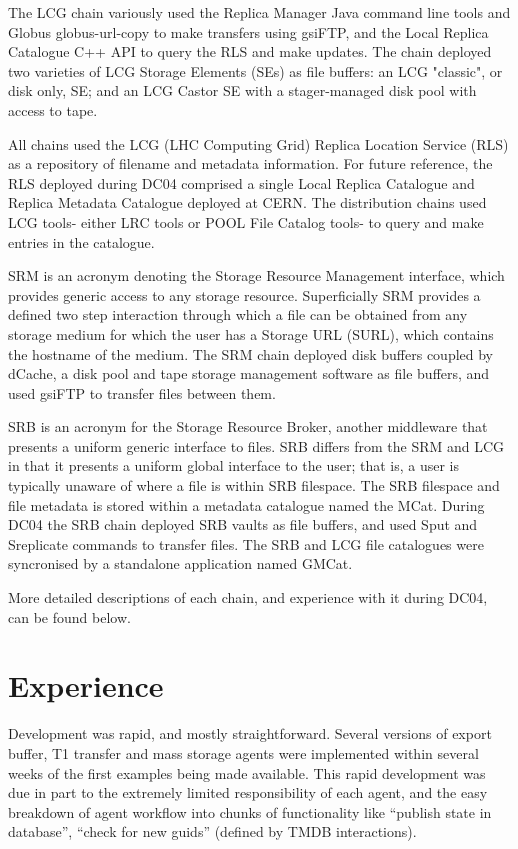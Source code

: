 \documentclass{cmspaper}
\begin{document}
The LCG chain variously used the Replica Manager Java command line tools and Globus globus-url-copy to make transfers using gsiFTP, and the Local Replica Catalogue C++ API to query the RLS and make updates. The chain deployed two varieties of LCG Storage Elements (SEs) as file buffers: an LCG "classic", or disk only, SE; and an LCG Castor SE with a stager-managed disk pool with access to tape.

All chains used the LCG (LHC Computing Grid) Replica Location Service (RLS) as a repository of filename and metadata information. For future reference, the RLS deployed during DC04 comprised a single Local Replica Catalogue and Replica Metadata Catalogue deployed at CERN. The distribution chains used LCG tools- either LRC tools or POOL File Catalog tools- to query and make entries in the catalogue.

SRM is an acronym denoting the Storage Resource Management interface, which provides generic access to any storage resource. Superficially SRM provides a defined two step interaction through which a file can be obtained from any storage medium for which the user has a Storage URL (SURL), which contains the hostname of the medium. The SRM chain deployed disk buffers coupled by dCache, a disk pool and tape storage management software as file buffers, and used gsiFTP to transfer files between them.

SRB is an acronym for the Storage Resource Broker, another middleware that presents a uniform generic interface to files. SRB differs from the SRM and LCG in that it presents a uniform global interface to the user; that is, a user is typically unaware of where a file is within SRB filespace. The SRB filespace and file metadata is stored within a metadata catalogue named the MCat. During DC04 the SRB chain deployed SRB vaults as file buffers, and used Sput and Sreplicate commands to transfer files. The SRB and LCG file catalogues were syncronised by a standalone application named GMCat.

More detailed descriptions of each chain, and experience with it during DC04, can be found below.

\section{Experience}
Development was rapid, and mostly straightforward. Several versions of export buffer, T1 transfer and mass storage agents were implemented within several weeks of the first examples being made available. This rapid development was due in part to the extremely limited responsibility of each agent, and the easy breakdown of agent workflow into chunks of functionality like ``publish state in database'', ``check for new guids'' (defined by TMDB interactions).
\end{document}
